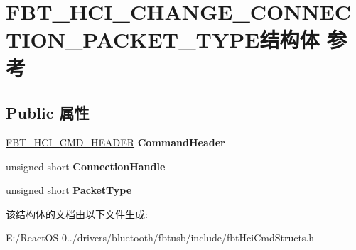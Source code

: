 \hypertarget{struct_f_b_t___h_c_i___c_h_a_n_g_e___c_o_n_n_e_c_t_i_o_n___p_a_c_k_e_t___t_y_p_e}{}\section{F\+B\+T\+\_\+\+H\+C\+I\+\_\+\+C\+H\+A\+N\+G\+E\+\_\+\+C\+O\+N\+N\+E\+C\+T\+I\+O\+N\+\_\+\+P\+A\+C\+K\+E\+T\+\_\+\+T\+Y\+P\+E结构体 参考}
\label{struct_f_b_t___h_c_i___c_h_a_n_g_e___c_o_n_n_e_c_t_i_o_n___p_a_c_k_e_t___t_y_p_e}
\subsection*{Public 属性}
\begin{DoxyCompactItemize}
\item 
\mbox{\label{struct_f_b_t___h_c_i___c_h_a_n_g_e___c_o_n_n_e_c_t_i_o_n___p_a_c_k_e_t___t_y_p_e_ac2b204e17e6ad2e2a7917ba4ed0f98a2}} 
\hyperlink{struct_f_b_t___h_c_i___c_m_d___h_e_a_d_e_r}{F\+B\+T\+\_\+\+H\+C\+I\+\_\+\+C\+M\+D\+\_\+\+H\+E\+A\+D\+ER} {\bfseries Command\+Header}
\item 
\mbox{\label{struct_f_b_t___h_c_i___c_h_a_n_g_e___c_o_n_n_e_c_t_i_o_n___p_a_c_k_e_t___t_y_p_e_a92d9664d290d534a7a55759d17dc22ce}} 
unsigned short {\bfseries Connection\+Handle}
\item 
\mbox{\label{struct_f_b_t___h_c_i___c_h_a_n_g_e___c_o_n_n_e_c_t_i_o_n___p_a_c_k_e_t___t_y_p_e_a2e89ca71f05b6de54ad68d7e839cae2f}} 
unsigned short {\bfseries Packet\+Type}
\end{DoxyCompactItemize}


该结构体的文档由以下文件生成\+:\begin{DoxyCompactItemize}
\item 
E\+:/\+React\+O\+S-\/0../drivers/bluetooth/fbtusb/include/fbt\+Hci\+Cmd\+Structs.\+h\end{DoxyCompactItemize}
